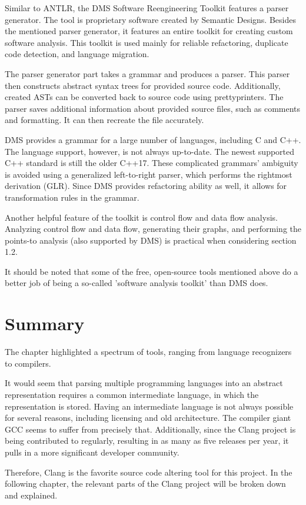 Similar to ANTLR, the DMS Software Reengineering Toolkit features 
a parser generator.
The tool is proprietary software created by Semantic Designs.
Besides the mentioned parser generator, it features an entire toolkit for 
creating custom software analysis.
This toolkit is used mainly for reliable refactoring, duplicate code 
detection, and language migration.

The parser generator part takes a grammar and produces a parser.
This parser then constructs abstract syntax trees for provided source code.
Additionally, created ASTs can be converted back to source code using 
prettyprinters.
The parser saves additional information about provided source files, such as 
comments and formatting.
It can then recreate the file accurately.

DMS provides a grammar for a large number of languages, including C and C++.
The language support, however, is not always up-to-date.
The newest supported C++ standard is still the older C++17.
These complicated grammars' ambiguity is avoided using a generalized 
left-to-right parser, which performs the rightmost derivation (GLR).
Since DMS provides refactoring ability as well, it allows for transformation 
rules in the grammar.

Another helpful feature of the toolkit is control flow and data flow analysis.
Analyzing control flow and data flow, generating their graphs, and performing 
the points-to analysis (also supported by DMS) is practical when considering 
section 1.2.

It should be noted that some of the free, open-source tools mentioned above 
do a better job of being a so-called 'software analysis toolkit' than 
DMS does.

\section{Summary}

The chapter highlighted a spectrum of tools, ranging from language
recognizers to compilers.

It would seem that parsing multiple programming languages into an abstract 
representation requires a common intermediate language, in which 
the representation is stored. 
Having an intermediate language is not always possible for several reasons, 
including licensing and old architecture. 
The compiler giant GCC seems to suffer from precisely that.
Additionally, since the Clang project is being contributed to regularly, 
resulting in as many as five releases per year, 
it pulls in a more significant developer community. 

Therefore, Clang is the favorite source code altering tool for this project. 
In the following chapter, the relevant parts of the Clang project 
will be broken down and explained.
